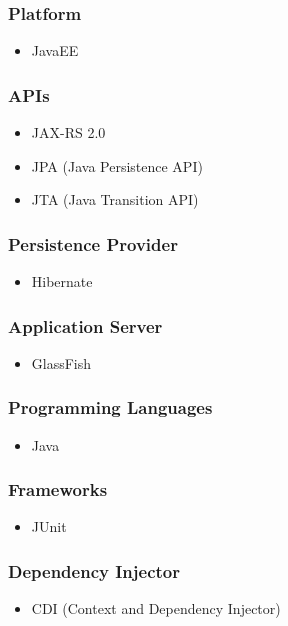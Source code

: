 \documentclass[hidelinks, 12pt, oneside]{article}
\begin{document}
	\subsubsection{Platform}
	\begin{itemize}
	\item JavaEE
	\end{itemize}
	\subsubsection{APIs}
	\begin{itemize}
	\item JAX-RS 2.0
	\item JPA (Java Persistence API)
	\item JTA (Java Transition API)
	\end{itemize}
	\subsubsection{Persistence Provider}
	\begin{itemize}
	\item Hibernate
	\end{itemize}
	\subsubsection{Application Server}
	\begin{itemize}
	\item GlassFish 
	\end{itemize}
	\subsubsection{Programming Languages}
	\begin{itemize}
	\item Java
	\end{itemize}
	\subsubsection{Frameworks}
	\begin{itemize}
	\item JUnit
	\end{itemize}
	\subsubsection{Dependency Injector}
	\begin{itemize}
	\item CDI (Context and Dependency Injector)
	\end{itemize}
\end{document}
